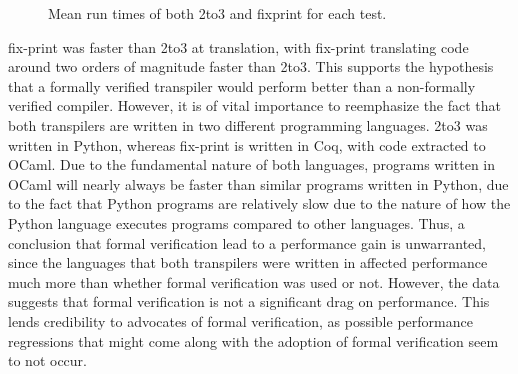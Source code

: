\begin{figure*}[ht]
    \caption{Mean run times of both 2to3 and fixprint for each test.}
\end{figure*}


fix-print was faster than 2to3 at translation, with fix-print translating code around two orders of magnitude faster than 2to3. This supports the hypothesis that a formally verified transpiler would perform better than a non-formally verified compiler. However, it is of vital importance to reemphasize the fact that both transpilers are written in two different programming languages. 2to3 was written in Python, whereas fix-print is written in Coq, with code extracted to OCaml. Due to the fundamental nature of both languages, programs written in OCaml will nearly always be faster than similar programs written in Python, due to the fact that Python programs are relatively slow due to the nature of how the Python language executes programs compared to other languages. Thus, a conclusion that formal verification lead to a performance gain is unwarranted, since the languages that both transpilers were written in affected performance much more than whether formal verification was used or not. However, the data suggests that formal verification is not a significant drag on performance. This lends credibility to advocates of formal verification, as possible performance regressions that might come along with the adoption of formal verification seem to not occur.


